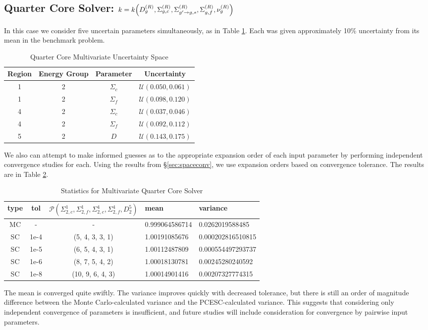 \newpage
\subsection{Quarter Core Solver: $k=k\qty(D_g^{(R)},\Sigma_{g,c}^{(R)},\Sigma_{g'\to g,s}^{(R)},\Sigma_{g,f}^{(R)},\nu_g^{(R)})$}
In this case we consider five uncertain parameters simultaneously, as in Table \ref{tab:2d2g5param}.  Each was given approximately 10\% uncertainty from its mean in the benchmark problem.
\begin{table}[H]
\begin{center}
\begin{tabular}{c c c c}
Region & Energy Group & Parameter & Uncertainty \\ \hline
1 & 2 & $\Sigma_c$ & $\mathcal{U}(0.050,0.061) $\\
1 & 2 & $\Sigma_f$ & $\mathcal{U}(0.098,0.120) $\\
4 & 2 & $\Sigma_c$ & $\mathcal{U}(0.037,0.046) $\\
4 & 2 & $\Sigma_f$ & $\mathcal{U}(0.092,0.112) $\\
5 & 2 & $D$            & $\mathcal{U}(0.143,0.175) $\\
\end{tabular}
\end{center}
\caption{Quarter Core Multivariate Uncertainty Space}
\label{tab:2d2g5param}
\end{table}

We also can attempt to make informed guesses as to the appropriate expansion order of each input parameter by performing independent convergence studies for each.  Using the results from \S \ref{sec:spaceconv}, we use expansion orders based on convergence tolerance.  The results are in Table \ref{tab:2dcrit5v}.

\begin{table}[H]
\begin{center}
\begin{tabular}{c c c|l l}
type & tol & $\mathcal{P}(\Sigma_{2,c}^1,\Sigma_{2,f}^1,\Sigma_{2,c}^4,\Sigma_{2,f}^4,D^5_2)$ & mean & variance \\ \hline
MC & - & - & 0.999064586714 & 0.0262019588485 \\
SC & 1e-4 & (5, 4, 3, 3, 1) & 1.00191085676 & 0.000202816510815 \\
SC & 1e-5 & (6, 5, 4, 3, 1) & 1.00112487809 & 0.000554497293737\\
SC & 1e-6 & (8, 7, 5, 4, 2) & 1.00018130781 & 0.00245280240592 \\
SC & 1e-8 & (10, 9, 6, 4, 3) & 1.00014901416 & 0.00207327774315
\end{tabular}
\end{center}
\caption{Statistics for Multivariate Quarter Core Solver}
\label{tab:2dcrit5v}
\end{table}
The mean is converged quite swiftly.  The variance improves quickly with decreased tolerance, but there is still an order of magnitude difference between the Monte Carlo-calculated variance and the PCESC-calculated variance.  This suggests that considering only independent convergence of parameters is insufficient, and future studies will include consideration for convergence by pairwise input parameters.
